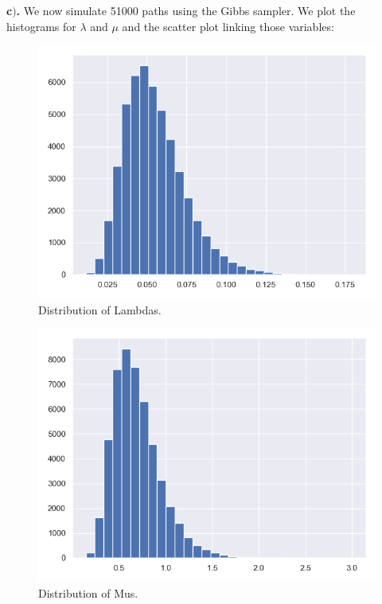 \documentclass[a4 paper]{article}
\begin{document}
\textbf{c$)$.} We now simulate 51000 paths
using the Gibbs sampler. We plot the 
histograms for $\lambda$ and $\mu$
and the scatter plot linking 
those variables:

\begin{figure}[H]
	\includegraphics[scale=0.4]{q2a}
	\centering
	\caption{Distribution of Lambdas.}
	\label{q2a}
\end{figure}

\begin{figure}[H]
	\includegraphics[scale=0.4]{q2b}
	\centering
	\caption{Distribution of Mus.}
	\label{q2b}
\end{figure}
\end{document}
